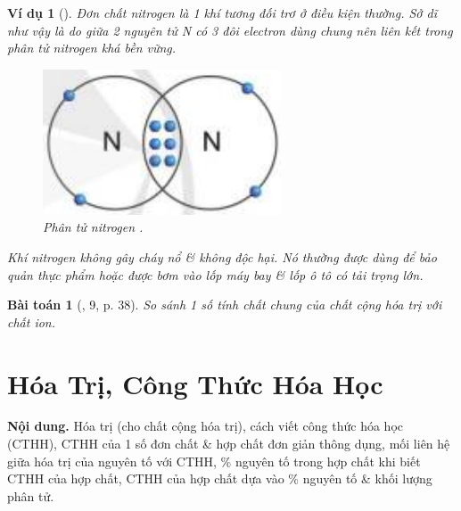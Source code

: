 \documentclass{article}
\newtheorem{baitoan}{Bài toán}
\newtheorem{vidu}{Ví dụ}
\begin{document}
\begin{vidu}[]
	Đơn chất nitrogen là 1 khí tương đối trơ ở điều kiện thường. Sở dĩ như vậy là do giữa 2 nguyên tử \emph{N} có 3 đôi electron dùng chung nên liên kết trong phân tử nitrogen khá bền vững.
	\begin{figure}[H]
		\centering
		\includegraphics[scale=0.3]{nitrogen}
		\caption{Phân tử nitrogen .}
	\end{figure}
	Khí nitrogen không gây cháy nổ \& không độc hại. Nó thường được dùng để bảo quản thực phẩm hoặc được bơm vào lốp máy bay \& lốp ô tô có tải trọng lớn.
\end{vidu}

\begin{baitoan}[\cite{SGK_KHTN_7_Canh_Dieu}, 9, p. 38]
	So sánh 1 số tính chất chung của chất cộng hóa trị với chất ion.
\end{baitoan}

\noindent{}


\section{Hóa Trị, Công Thức Hóa Học}
\textsf{\textbf{Nội dung.} Hóa trị (cho chất cộng hóa trị), cách viết công thức hóa học (CTHH), CTHH của 1 số đơn chất \& hợp chất đơn giản thông dụng, mối liên hệ giữa hóa trị của nguyên tố với CTHH, \% nguyên tố trong hợp chất khi biết CTHH của hợp chất, CTHH của hợp chất dựa vào \% nguyên tố \& khối lượng phân tử.}
\end{document}
